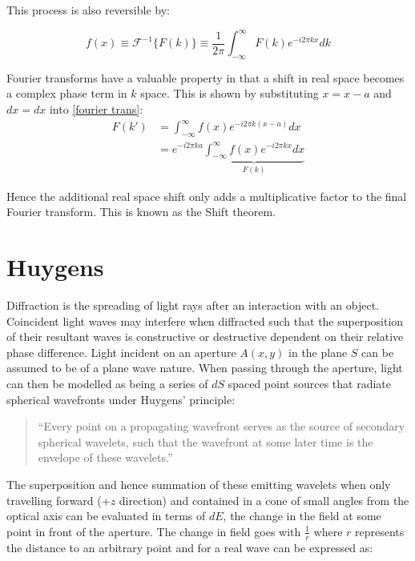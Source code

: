 This process is also reversible by:

\begin{equation}
f(x) \equiv\mathcal{F}^{-1}  \{F(k)\} \equiv \frac{1}{2 \pi} \int_{-\infty}^{\infty}F(k) e^{-i2 \pi kx} dk
\end{equation}


Fourier transforms have a valuable property in that a shift in real space becomes a complex phase term in $k$ space. This is shown by substituting $x = x-a$ and $dx = dx$ into \eqref{fourier trans}:
\begin{align}
F(k') &=  \int_{-\infty}^{\infty}f(x) e^{-i2 \pi k(x-a)} dx \nonumber\\
&=  e^{-i2 \pi ka} \underbrace{\int_{-\infty}^{\infty}f(x) e^{-i2 \pi kx}dx}_{F(k)}   \label{shift_ivariance}
\end{align}

Hence the additional real space shift only adds a multiplicative factor to the final Fourier transform. This is known as the Shift theorem.

\section{Huygens}

Diffraction is the spreading of light rays after an interaction with an object. Coincident light waves may interfere when diffracted such that the superposition of their resultant waves is constructive or destructive dependent on their relative phase difference. Light incident on an aperture $A(x,y)$ in the plane $S$ can be assumed to be of a plane wave nature. When passing through the aperture, light can then be modelled as being a series of $dS$ spaced point sources that radiate spherical wavefronts under Huygens' principle:

\begin{quote}
``Every point on a propagating wavefront serves as the source of secondary spherical wavelets, such that the wavefront at some later time is the envelope of these wavelets.''~\cite{goodmanIntroductionFourierOptics1996}
\end{quote}

%

The superposition and hence summation of these emitting wavelets when only travelling forward ($+z$ direction) and contained in a cone of small angles from the optical axis can be evaluated in terms of $dE$, the change in the field at some point in front of the aperture. The change in field goes with $\frac{1}{r}$ where $r$ represents the distance to an arbitrary point and for a real wave can be expressed as:

